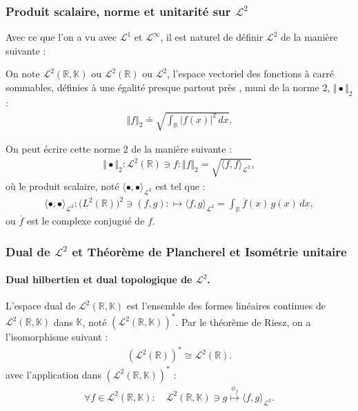 \subsubsection{Produit scalaire, norme et unitarité sur $\mathcal L^2$}

Avec ce que l'on a vu avec $\mathcal L^1$ et $\mathcal L^\infty$, il est naturel de définir $\mathcal L^2$ de la manière suivante :

\begin{Defi} On note $\mathcal L^2(\mathbb{R} , \mathbb K)$ ou $\mathcal L^2(\mathbb{R})$ ou $\mathcal L^2$, l'espace vectoriel des fonctions à carré sommables, définies \guillemotleft{} à une égalité presque partout près \guillemotright{}, muni de la norme 2, $\Vert \bullet \Vert_2$:
    \begin{eqnarray}
        \Vert f \Vert_2 \doteq \sqrt{\int_{\mathbb{R}} \vert f(x) \vert^2 \, dx} .
    \end{eqnarray}
\end{Defi}

On peut écrire cette norme 2 de la manière suivante :
\begin{eqnarray}
    \Vert \bullet \Vert_2 \colon \mathcal L^2 (\mathbb R) \ni f \colon \Vert f \Vert_2 = \sqrt{\langle f , f \rangle_{\mathcal L^2 }} ,
\end{eqnarray}
où le produit scalaire, noté $\langle \bullet, \bullet \rangle_{\mathcal L^2 }$ est tel que :
\begin{eqnarray}
    \langle \bullet, \bullet \rangle_{\mathcal L^2 } \colon \mathcal (L^2 (\mathbb R))^2 \ni (f,g) \colon  \mapsto \langle f, g \rangle_{\mathcal L^2 } = \int_{\mathbb R} \overline f (x) \, g(x) \, dx  ,
\end{eqnarray}
ou $\overline f$ est le complexe conjugué de $f$.



\subsubsection{Dual de $\mathcal L^2$ et Théorème de Plancherel et Isométrie unitaire}

\paragraph{Dual hilbertien et dual topologique de $\mathcal L^2$.}

L'espace dual de $\mathcal{L}^2(\mathbb{R}, \mathbb{K})$ est l'ensemble des formes linéaires continues de $\mathcal{L}^2(\mathbb{R}, \mathbb{K})$ dans $\mathbb{K}$, noté $(\mathcal{L}^2(\mathbb{R}, \mathbb{K}))^\ast$. Par le théorème de Riesz, on a l'isomorphisme suivant : 
\begin{eqnarray}
    (\mathcal{L}^2(\mathbb{R}))^\ast \cong \mathcal{L}^2(\mathbb{R}) .\label{eq:riesz}
\end{eqnarray}
avec l'application dans  $(\mathcal{L}^2(\mathbb{R}, \mathbb{K}))^\ast $ : 
\begin{eqnarray}
     \forall f \in \mathcal{L}^2(\mathbb{R},\mathbb K)\colon  \quad  \mathcal{L}^2(\mathbb{R},\mathbb K) \ni  g 	\overset{\phi_f}{\mapsto} \langle f , g \rangle_{\mathcal L^2 }. 
\end{eqnarray} 

